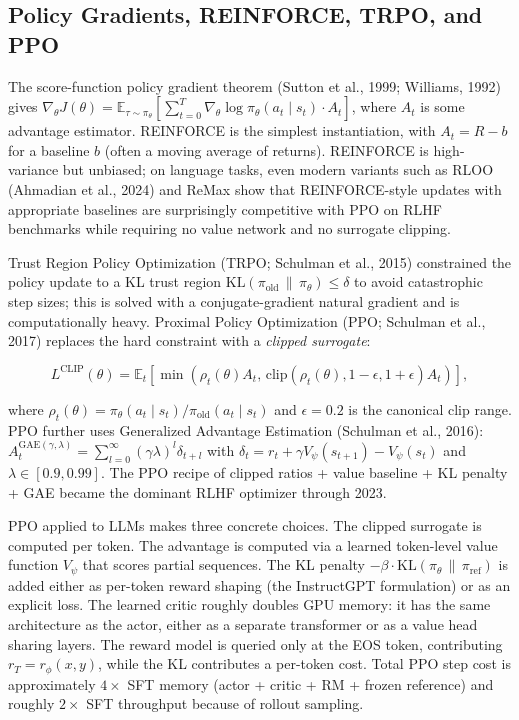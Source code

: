 \subsection{Policy Gradients, REINFORCE, TRPO, and PPO}\label{policy-gradients-reinforce-trpo-and-ppo}

The score-function policy gradient theorem (Sutton et al., 1999; Williams, 1992) gives \(\nabla_\theta J(\theta) = \mathbb{E}_{\tau \sim \pi_\theta} \left[ \sum_{t=0}^{T} \nabla_\theta \log \pi_\theta(a_t \mid s_t) \cdot A_t \right]\), where \(A_t\) is some advantage estimator. REINFORCE is the simplest instantiation, with \(A_t = R - b\) for a baseline \(b\) (often a moving average of returns). REINFORCE is high-variance but unbiased; on language tasks, even modern variants such as RLOO (Ahmadian et al., 2024) and ReMax show that REINFORCE-style updates with appropriate baselines are surprisingly competitive with PPO on RLHF benchmarks while requiring no value network and no surrogate clipping.

Trust Region Policy Optimization (TRPO; Schulman et al., 2015) constrained the policy update to a KL trust region \(\mathrm{KL}(\pi_{\text{old}} \,\|\, \pi_\theta) \le \delta\) to avoid catastrophic step sizes; this is solved with a conjugate-gradient natural gradient and is computationally heavy. Proximal Policy Optimization (PPO; Schulman et al., 2017) replaces the hard constraint with a \emph{clipped surrogate}:

\[L^{\mathrm{CLIP}}(\theta) = \mathbb{E}_t \left[ \min\left(\rho_t(\theta) A_t, \, \mathrm{clip}(\rho_t(\theta), 1-\epsilon, 1+\epsilon) A_t \right) \right],\]

where \(\rho_t(\theta) = \pi_\theta(a_t \mid s_t)/\pi_{\text{old}}(a_t \mid s_t)\) and \(\epsilon = 0.2\) is the canonical clip range. PPO further uses Generalized Advantage Estimation (Schulman et al., 2016): \(A_t^{\mathrm{GAE}(\gamma, \lambda)} = \sum_{l=0}^{\infty} (\gamma \lambda)^l \delta_{t+l}\) with \(\delta_t = r_t + \gamma V_\psi(s_{t+1}) - V_\psi(s_t)\) and \(\lambda \in [0.9, 0.99]\). The PPO recipe of clipped ratios + value baseline + KL penalty + GAE became the dominant RLHF optimizer through 2023.

PPO applied to LLMs makes three concrete choices. The clipped surrogate is computed per token. The advantage is computed via a learned token-level value function \(V_\psi\) that scores partial sequences. The KL penalty \(-\beta \cdot \mathrm{KL}(\pi_\theta \,\|\, \pi_{\text{ref}})\) is added either as per-token reward shaping (the InstructGPT formulation) or as an explicit loss. The learned critic roughly doubles GPU memory: it has the same architecture as the actor, either as a separate transformer or as a value head sharing layers. The reward model is queried only at the EOS token, contributing \(r_T = r_\phi(x, y)\), while the KL contributes a per-token cost. Total PPO step cost is approximately \(4\times\) SFT memory (actor + critic + RM + frozen reference) and roughly \(2\times\) SFT throughput because of rollout sampling.

